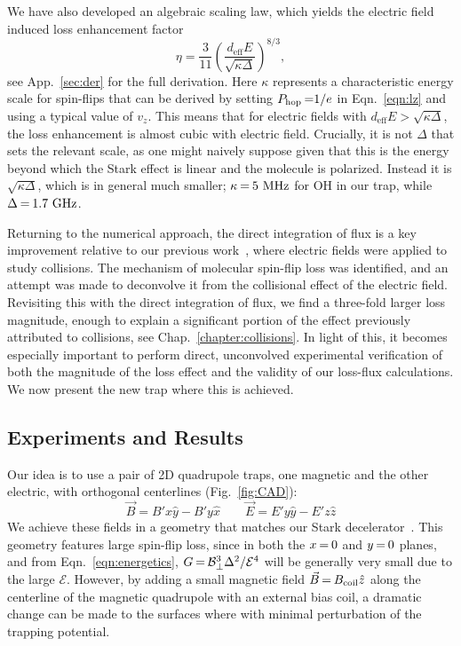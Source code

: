 \documentclass[defaultstyle,11pt]{thesis}
\begin{document}
We have also developed an algebraic scaling law, which yields the electric field induced loss enhancement factor
\begin{equation}
\label{eq:etaMT}
\eta=\frac{3}{11} \left(\frac{d_\text{eff}E}{\sqrt{\kappa\Delta}}\right)^{8/3},
\end{equation}
see App.~\ref{sec:der} for the full derivation.
Here $\kappa$ represents a characteristic energy scale for spin-flips that can be derived by setting $P_\text{hop}{\nobreak\hspace{.2em}} {=}1/e$ in Eqn.~\ref{eqn:lz} and using a typical value of $v_z$.
This means that for electric fields with $d_\text{eff}E>\sqrt{\kappa\Delta}$, the loss enhancement is almost cubic with electric field.
Crucially, it is not $\Delta$ that sets the relevant scale, as one might naively suppose given that this is the energy beyond which the Stark effect is linear and the molecule is polarized.
Instead it is $\sqrt{\kappa\Delta}$, which is in general much smaller; $\kappa{\nobreak\hspace{.2em}} {=}{\nobreak\hspace{.2em}} 5\text{ MHz}$ for OH in our trap, while $\Delta{\nobreak\hspace{.2em}} {=}{\nobreak\hspace{.2em}}1.7\text{ GHz}$.

Returning to the numerical approach, the direct integration of flux is a key improvement relative to our previous work~\cite{Stuhl2013}, where electric fields were applied to study collisions.
The mechanism of molecular spin-flip loss was identified, and an attempt was made to deconvolve it from the collisional effect of the electric field.
Revisiting this with the direct integration of flux, we find a three-fold larger loss magnitude, enough to explain a significant portion of the effect previously attributed to collisions, see Chap.~\ref{chapter:collisions}.
In light of this, it becomes especially important to perform direct, unconvolved experimental verification of both the magnitude of the loss effect and the validity of our loss-flux calculations.
We now present the new trap where this is achieved.


\subsection{Experiments and Results\label{sec:results}}

Our idea is to use a pair of 2D quadrupole traps, one magnetic and the other electric, with orthogonal centerlines (Fig.~\ref{fig:CAD}):
\begin{equation}
\label{eqn:BE}
\vec{B}=B'x\hat{y}-B'y\hat{x}\quad\quad\vec{E}=E'y\hat{y}-E'z\hat{z}
\end{equation}
We achieve these fields in a geometry that matches our Stark decelerator~\cite{Bochinski2003}.
This geometry features large spin-flip loss, since \epb{} in both the $x{\nobreak\hspace{.2em}} {=}{\nobreak\hspace{.2em}} 0$ and $y{\nobreak\hspace{.2em}} {=}{\nobreak\hspace{.2em}} 0$ planes, and from Eqn.~\ref{eqn:energetics}, $G{\nobreak\hspace{.2em}} {=} {\nobreak\hspace{.2em}} \mathcal{B}_\perp^3\Delta^2/\mathcal{E}^4$ will be generally very small due to the large $\mathcal{E}$.
However, by adding a small magnetic field $\vec{B}{\nobreak\hspace{.2em}} {=}{\nobreak\hspace{.2em}} B_\text{coil}\hat{z}$ along the centerline of the magnetic quadrupole with an external bias coil, a dramatic change can be made to the surfaces where \epb{} with minimal perturbation of the trapping potential.
\end{document}
